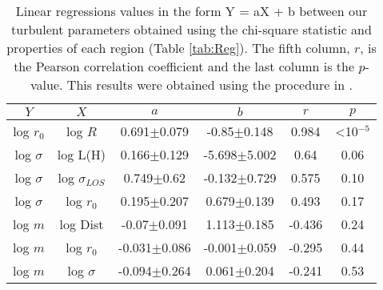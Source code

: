 \begin{table*}
\begin{center}
\caption{Linear regressions values in the form Y = aX + b between our turbulent parameters obtained using the chi-square statistic and properties of each region (Table \ref{tab:Reg}). The fifth column, $r$, is the Pearson correlation coefficient and the last column is the $p$-value. This results were obtained using the procedure in \citet{2007ApJ...665.1489K}.}
\begin{tabular}{cccccc}
\hline
            $Y$ &                   $X$ &                 $a$ &                 $b$ &       $r$ &      $p$ \\
\hline
    log $r_0$ &             log $R$ &   0.691$\pm$0.079 &   -0.85$\pm$0.148 &   0.984 &    <10\(^{-5}\) \\
 log $\sigma$ &            log L(H) &   0.166$\pm$0.129 &  -5.698$\pm$5.002 &    0.64 &  0.06 \\
 log $\sigma$ &  log $\sigma_{LOS}$ &    0.749$\pm$0.62 &  -0.132$\pm$0.729 &   0.575 &  0.10 \\
 log $\sigma$ &         log $r_{0}$ &   0.195$\pm$0.207 &   0.679$\pm$0.139 &   0.493 &  0.17 \\
      log $m$ &            log Dist &   -0.07$\pm$0.091 &   1.113$\pm$0.185 &  -0.436 &  0.24 \\
      log $m$ &         log $r_{0}$ &  -0.031$\pm$0.086 &  -0.001$\pm$0.059 &  -0.295 &  0.44 \\
      log $m$ &        log $\sigma$ &  -0.094$\pm$0.264 &   0.061$\pm$0.204 &  -0.241 &  0.53 \\
\hline
\end{tabular}\label{tab:RestStats}
\end{center}
\end{table*}


